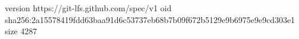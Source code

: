 version https://git-lfs.github.com/spec/v1
oid sha256:2a15578419fdd63baa91d6c53737eb68b7b09f672b5129e9b6975e9e9cd303e1
size 4287
